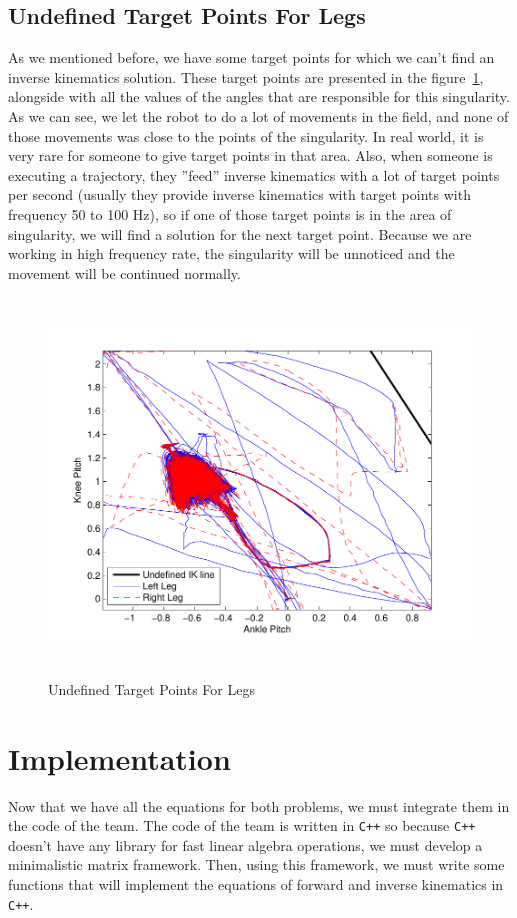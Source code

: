 \subsection{Undefined Target Points For Legs}
\label{undefined}
As we mentioned before, we have some target points for which we can't find an inverse kinematics solution. These target points are presented in the figure~\ref{fig:undefined}, alongside with all the values of the angles that are responsible for this singularity. As we can see, we let the robot to do a lot of movements in the field, and none of those movements was close to the points of the singularity. In real world, it is very rare for someone to give target points in that area. Also, when someone is executing a trajectory, they ''feed'' inverse kinematics with a lot of target points per second (usually they provide inverse kinematics with target points with frequency 50 to 100 Hz), so if one of those target points is in the area of singularity, we will find a solution for the next target point. Because we are working in high frequency rate, the singularity will be unnoticed and the movement will be continued normally.

\begin{figure}[h]
	\begin{center}
		\includegraphics[height = 10cm]{Figures/undefined.pdf}
 		\caption{Undefined Target Points For Legs}
 		\label{fig:undefined}
	\end{center}
\end{figure}


\section{Implementation}
Now that we have all the equations for both problems, we must integrate them in the code of the team. The code of the team is written in \verb!C++! so because \verb!C++! doesn't have any library for fast linear algebra operations, we must develop a minimalistic matrix framework. Then, using this framework, we must write some functions that will implement the equations of forward and inverse kinematics in \verb!C++!.

